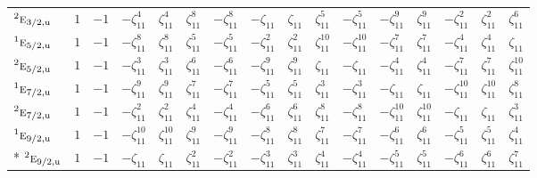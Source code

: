 \documentclass[10pt,a4paper]{article}
\numberwithin{equation}{section}
\newcommand{\irr}[1]{\text{\normalfont\scshape #1}}
\newcommand{\conjpair}[1]{{}^{#1}}
\newcommand{\ptag}[1]{\mathrm{#1}}
\newcommand{\rootunity}[1]{\zeta_{#1}}
\begin{document}
{\begin{longtable}{@{}lccccccccccccccc@{}}
$\conjpair{2}\irr{e}_{3/2,\ptag{u}}$ & $1$ & $-1$ & $-\rootunity{11}^{4}$ & $\rootunity{11}^{4}$ & $\rootunity{11}^{8}$ & $-\rootunity{11}^{8}$ & $-\rootunity{11}$ & $\rootunity{11}$ & $\rootunity{11}^{5}$ & $-\rootunity{11}^{5}$ & $-\rootunity{11}^{9}$ & $\rootunity{11}^{9}$ & $-\rootunity{11}^{2}$ & $\rootunity{11}^{2}$ & $\rootunity{11}^{6}$\\
$\conjpair{1}\irr{e}_{5/2,\ptag{u}}$ & $1$ & $-1$ & $-\rootunity{11}^{8}$ & $\rootunity{11}^{8}$ & $\rootunity{11}^{5}$ & $-\rootunity{11}^{5}$ & $-\rootunity{11}^{2}$ & $\rootunity{11}^{2}$ & $\rootunity{11}^{10}$ & $-\rootunity{11}^{10}$ & $-\rootunity{11}^{7}$ & $\rootunity{11}^{7}$ & $-\rootunity{11}^{4}$ & $\rootunity{11}^{4}$ & $\rootunity{11}$\\
$\conjpair{2}\irr{e}_{5/2,\ptag{u}}$ & $1$ & $-1$ & $-\rootunity{11}^{3}$ & $\rootunity{11}^{3}$ & $\rootunity{11}^{6}$ & $-\rootunity{11}^{6}$ & $-\rootunity{11}^{9}$ & $\rootunity{11}^{9}$ & $\rootunity{11}$ & $-\rootunity{11}$ & $-\rootunity{11}^{4}$ & $\rootunity{11}^{4}$ & $-\rootunity{11}^{7}$ & $\rootunity{11}^{7}$ & $\rootunity{11}^{10}$\\
$\conjpair{1}\irr{e}_{7/2,\ptag{u}}$ & $1$ & $-1$ & $-\rootunity{11}^{9}$ & $\rootunity{11}^{9}$ & $\rootunity{11}^{7}$ & $-\rootunity{11}^{7}$ & $-\rootunity{11}^{5}$ & $\rootunity{11}^{5}$ & $\rootunity{11}^{3}$ & $-\rootunity{11}^{3}$ & $-\rootunity{11}$ & $\rootunity{11}$ & $-\rootunity{11}^{10}$ & $\rootunity{11}^{10}$ & $\rootunity{11}^{8}$\\
$\conjpair{2}\irr{e}_{7/2,\ptag{u}}$ & $1$ & $-1$ & $-\rootunity{11}^{2}$ & $\rootunity{11}^{2}$ & $\rootunity{11}^{4}$ & $-\rootunity{11}^{4}$ & $-\rootunity{11}^{6}$ & $\rootunity{11}^{6}$ & $\rootunity{11}^{8}$ & $-\rootunity{11}^{8}$ & $-\rootunity{11}^{10}$ & $\rootunity{11}^{10}$ & $-\rootunity{11}$ & $\rootunity{11}$ & $\rootunity{11}^{3}$\\
$\conjpair{1}\irr{e}_{9/2,\ptag{u}}$ & $1$ & $-1$ & $-\rootunity{11}^{10}$ & $\rootunity{11}^{10}$ & $\rootunity{11}^{9}$ & $-\rootunity{11}^{9}$ & $-\rootunity{11}^{8}$ & $\rootunity{11}^{8}$ & $\rootunity{11}^{7}$ & $-\rootunity{11}^{7}$ & $-\rootunity{11}^{6}$ & $\rootunity{11}^{6}$ & $-\rootunity{11}^{5}$ & $\rootunity{11}^{5}$ & $\rootunity{11}^{4}$\\*
$\conjpair{2}\irr{e}_{9/2,\ptag{u}}$ & $1$ & $-1$ & $-\rootunity{11}$ & $\rootunity{11}$ & $\rootunity{11}^{2}$ & $-\rootunity{11}^{2}$ & $-\rootunity{11}^{3}$ & $\rootunity{11}^{3}$ & $\rootunity{11}^{4}$ & $-\rootunity{11}^{4}$ & $-\rootunity{11}^{5}$ & $\rootunity{11}^{5}$ & $-\rootunity{11}^{6}$ & $\rootunity{11}^{6}$ & $\rootunity{11}^{7}$\\
\bottomrule\end{longtable}}
\end{document}
